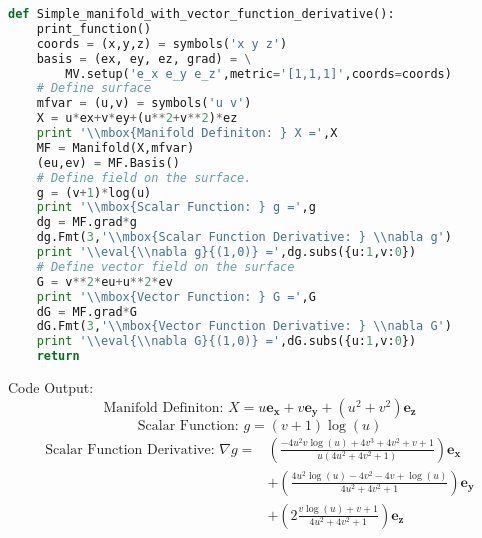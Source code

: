 \documentclass[10pt]{article}
\newcommand{\eval}[2]{\left . {#1} \right |_{#2}}
\begin{document}
\begin{lstlisting}[language=Python,showspaces=false,showstringspaces=false,backgroundcolor=\color{gray},frame=single]
def Simple_manifold_with_vector_function_derivative():
    print_function()
    coords = (x,y,z) = symbols('x y z')
    basis = (ex, ey, ez, grad) = \
        MV.setup('e_x e_y e_z',metric='[1,1,1]',coords=coords)
    # Define surface
    mfvar = (u,v) = symbols('u v')
    X = u*ex+v*ey+(u**2+v**2)*ez
    print '\\mbox{Manifold Definiton: } X =',X
    MF = Manifold(X,mfvar)
    (eu,ev) = MF.Basis()
    # Define field on the surface.
    g = (v+1)*log(u)
    print '\\mbox{Scalar Function: } g =',g
    dg = MF.grad*g
    dg.Fmt(3,'\\mbox{Scalar Function Derivative: } \\nabla g')
    print '\\eval{\\nabla g}{(1,0)} =',dg.subs({u:1,v:0})
    # Define vector field on the surface
    G = v**2*eu+u**2*ev
    print '\\mbox{Vector Function: } G =',G
    dG = MF.grad*G
    dG.Fmt(3,'\\mbox{Vector Function Derivative: } \\nabla G')
    print '\\eval{\\nabla G}{(1,0)} =',dG.subs({u:1,v:0})
    return
\end{lstlisting}
Code Output:
\begin{equation*} \mbox{Manifold Definiton: } X = u\bm{e_{x}}+v\bm{e_{y}}+\left ( u^{2} + v^{2}\right ) \bm{e_{z}} \end{equation*}
\begin{equation*} \mbox{Scalar Function: } g = \left(v + 1\right) \log{\left (u \right )} \end{equation*}
 \begin{align*} \mbox{Scalar Function Derivative: } \nabla g =  & \left ( \frac{- 4 u^{2} v \log{\left (u \right )} + 4 v^{3} + 4 v^{2} + v + 1}{u \left(4 u^{2} + 4 v^{2} + 1\right)}\right ) \bm{e_{x}} \\  & +\left ( \frac{4 u^{2} \log{\left (u \right )} - 4 v^{2} - 4 v + \log{\left (u \right )}}{4 u^{2} + 4 v^{2} + 1}\right ) \bm{e_{y}} \\  & +\left ( 2 \frac{v \log{\left (u \right )} + v + 1}{4 u^{2} + 4 v^{2} + 1}\right ) \bm{e_{z}} \\ \end{align*} 
\end{document}
